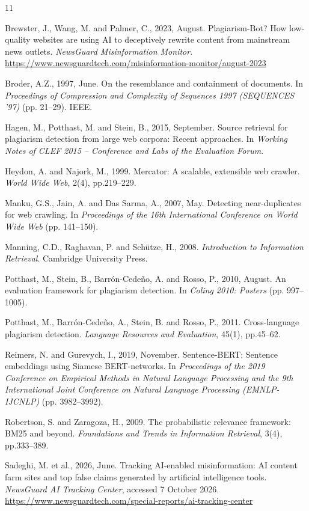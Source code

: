 \documentclass[11pt,a4paper]{article}
\begin{document}
\begin{thebibliography}{11}
\small
\setlength{\itemsep}{0.2em}

 Brewster, J., Wang, M. and Palmer, C., 2023, August. Plagiarism-Bot? How low-quality websites are using AI to deceptively rewrite content from mainstream news outlets. \textit{NewsGuard Misinformation Monitor}. \url{https://www.newsguardtech.com/misinformation-monitor/august-2023}

 Broder, A.Z., 1997, June. On the resemblance and containment of documents. In \textit{Proceedings of Compression and Complexity of Sequences 1997 (SEQUENCES '97)} (pp. 21--29). IEEE.

 Hagen, M., Potthast, M. and Stein, B., 2015, September. Source retrieval for plagiarism detection from large web corpora: Recent approaches. In \textit{Working Notes of CLEF 2015 -- Conference and Labs of the Evaluation Forum}.

 Heydon, A. and Najork, M., 1999. Mercator: A scalable, extensible web crawler. \textit{World Wide Web}, 2(4), pp.219--229.

 Manku, G.S., Jain, A. and Das Sarma, A., 2007, May. Detecting near-duplicates for web crawling. In \textit{Proceedings of the 16th International Conference on World Wide Web} (pp. 141--150).

 Manning, C.D., Raghavan, P. and Sch\"utze, H., 2008. \textit{Introduction to Information Retrieval}. Cambridge University Press.

 Potthast, M., Stein, B., Barr\'on-Cede\~no, A. and Rosso, P., 2010, August. An evaluation framework for plagiarism detection. In \textit{Coling 2010: Posters} (pp. 997--1005).

 Potthast, M., Barr\'on-Cede\~no, A., Stein, B. and Rosso, P., 2011. Cross-language plagiarism detection. \textit{Language Resources and Evaluation}, 45(1), pp.45--62.

 Reimers, N. and Gurevych, I., 2019, November. Sentence-BERT: Sentence embeddings using Siamese BERT-networks. In \textit{Proceedings of the 2019 Conference on Empirical Methods in Natural Language Processing and the 9th International Joint Conference on Natural Language Processing (EMNLP-IJCNLP)} (pp. 3982--3992).

 Robertson, S. and Zaragoza, H., 2009. The probabilistic relevance framework: BM25 and beyond. \textit{Foundations and Trends in Information Retrieval}, 3(4), pp.333--389.

 Sadeghi, M. et al., 2026, June. Tracking AI-enabled misinformation: AI content farm sites and top false claims generated by artificial intelligence tools. \textit{NewsGuard AI Tracking Center}, accessed 7 October 2026. \url{https://www.newsguardtech.com/special-reports/ai-tracking-center}

\end{thebibliography}
\end{document}
